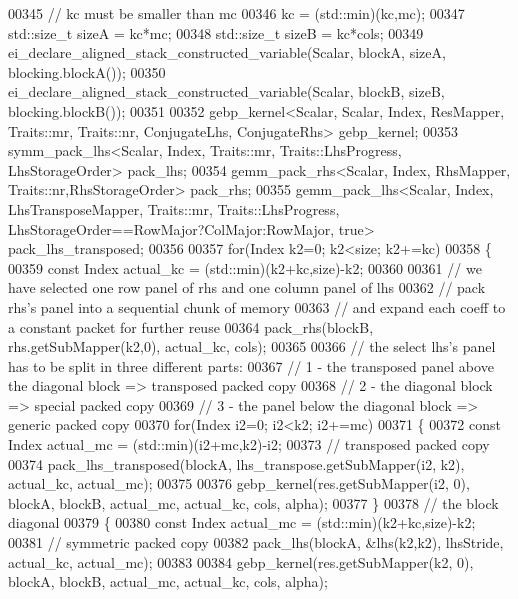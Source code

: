 \begin{DoxyCode}
00345     \textcolor{comment}{// kc must be smaller than mc}
00346     kc = (std::min)(kc,mc);
00347     std::size\_t sizeA = kc*mc;
00348     std::size\_t sizeB = kc*cols;
00349     ei\_declare\_aligned\_stack\_constructed\_variable(Scalar, blockA, sizeA, blocking.blockA());
00350     ei\_declare\_aligned\_stack\_constructed\_variable(Scalar, blockB, sizeB, blocking.blockB());
00351 
00352     gebp\_kernel<Scalar, Scalar, Index, ResMapper, Traits::mr, Traits::nr, ConjugateLhs, ConjugateRhs> 
      gebp\_kernel;
00353     symm\_pack\_lhs<Scalar, Index, Traits::mr, Traits::LhsProgress, LhsStorageOrder> pack\_lhs;
00354     gemm\_pack\_rhs<Scalar, Index, RhsMapper, Traits::nr,RhsStorageOrder> pack\_rhs;
00355     gemm\_pack\_lhs<Scalar, Index, LhsTransposeMapper, Traits::mr, Traits::LhsProgress,
       LhsStorageOrder==RowMajor?ColMajor:RowMajor, true> pack\_lhs\_transposed;
00356 
00357     \textcolor{keywordflow}{for}(Index k2=0; k2<size; k2+=kc)
00358     \{
00359       \textcolor{keyword}{const} Index actual\_kc = (std::min)(k2+kc,size)-k2;
00360 
00361       \textcolor{comment}{// we have selected one row panel of rhs and one column panel of lhs}
00362       \textcolor{comment}{// pack rhs's panel into a sequential chunk of memory}
00363       \textcolor{comment}{// and expand each coeff to a constant packet for further reuse}
00364       pack\_rhs(blockB, rhs.getSubMapper(k2,0), actual\_kc, cols);
00365 
00366       \textcolor{comment}{// the select lhs's panel has to be split in three different parts:}
00367       \textcolor{comment}{//  1 - the transposed panel above the diagonal block => transposed packed copy}
00368       \textcolor{comment}{//  2 - the diagonal block => special packed copy}
00369       \textcolor{comment}{//  3 - the panel below the diagonal block => generic packed copy}
00370       \textcolor{keywordflow}{for}(Index i2=0; i2<k2; i2+=mc)
00371       \{
00372         \textcolor{keyword}{const} Index actual\_mc = (std::min)(i2+mc,k2)-i2;
00373         \textcolor{comment}{// transposed packed copy}
00374         pack\_lhs\_transposed(blockA, lhs\_transpose.getSubMapper(i2, k2), actual\_kc, actual\_mc);
00375 
00376         gebp\_kernel(res.getSubMapper(i2, 0), blockA, blockB, actual\_mc, actual\_kc, cols, alpha);
00377       \}
00378       \textcolor{comment}{// the block diagonal}
00379       \{
00380         \textcolor{keyword}{const} Index actual\_mc = (std::min)(k2+kc,size)-k2;
00381         \textcolor{comment}{// symmetric packed copy}
00382         pack\_lhs(blockA, &lhs(k2,k2), lhsStride, actual\_kc, actual\_mc);
00383 
00384         gebp\_kernel(res.getSubMapper(k2, 0), blockA, blockB, actual\_mc, actual\_kc, cols, alpha);

\end{DoxyCode}
